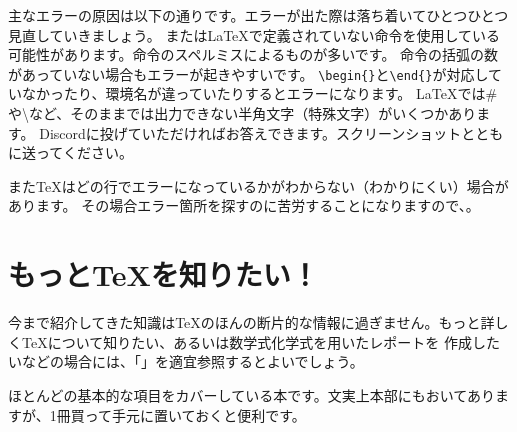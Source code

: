 \begin{multicols*}{2}
主なエラーの原因は以下の通りです。エラーが出た際は落ち着いてひとつひとつ見直していきましょう。
\BunTeX または\LaTeX で定義されていない命令を使用している可能性があります。命令のスペルミスによるものが多いです。
命令の括弧の数があっていない場合もエラーが起きやすいです。
\verb|\begin{}|と\verb|\end{}|が対応していなかったり、環境名が違っていたりするとエラーになります。
\LaTeX では\# や{\textbackslash}など、そのままでは出力できない半角文字（特殊文字）がいくつかあります。\footnotemark[2]
Discordに投げていただければお答えできます。スクリーンショットとともに送ってください。

また\TeX はどの行でエラーになっているかがわからない（わかりにくい）場合があります。
その場合エラー箇所を探すのに苦労することになりますので、。

\section{もっと\TeX を知りたい！}
今まで紹介してきた知識は\TeX のほんの断片的な情報に過ぎません。もっと詳しく\TeX について知りたい、あるいは数学式化学式を用いたレポートを
作成したいなどの場合には、「」を適宜参照するとよいでしょう。

ほとんどの基本的な項目をカバーしている本です。文実上本部にもおいてありますが、1冊買って手元に置いておくと便利です。
\newcolumn
{}

\end{multicols*}